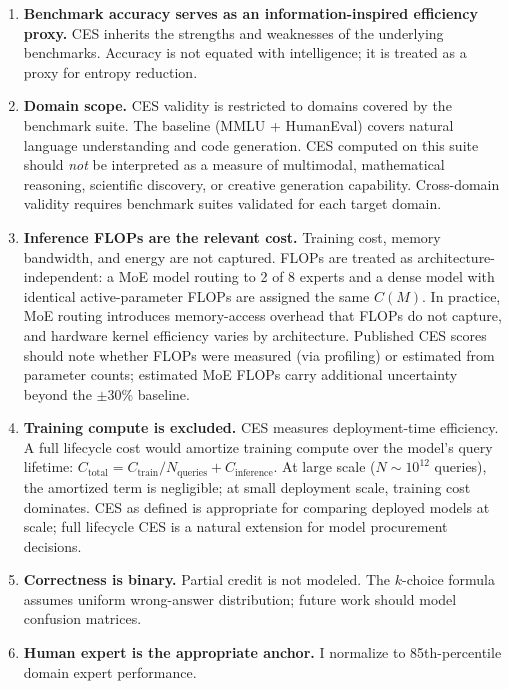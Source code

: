 \documentclass[12pt]{article}
\begin{document}
\begin{enumerate}
    \item \textbf{Benchmark accuracy serves as an information-inspired efficiency proxy.} CES inherits the strengths and weaknesses of the underlying benchmarks. Accuracy is not equated with intelligence; it is treated as a proxy for entropy reduction.
    \item \textbf{Domain scope.} CES validity is restricted to domains covered by the benchmark suite. The baseline (MMLU + HumanEval) covers natural language understanding and code generation. CES computed on this suite should \emph{not} be interpreted as a measure of multimodal, mathematical reasoning, scientific discovery, or creative generation capability. Cross-domain validity requires benchmark suites validated for each target domain.
    \item \textbf{Inference FLOPs are the relevant cost.} Training cost, memory bandwidth, and energy are not captured. FLOPs are treated as architecture-independent: a MoE model routing to 2 of 8 experts and a dense model with identical active-parameter FLOPs are assigned the same $C(M)$. In practice, MoE routing introduces memory-access overhead that FLOPs do not capture, and hardware kernel efficiency varies by architecture. Published CES scores should note whether FLOPs were measured (via profiling) or estimated from parameter counts; estimated MoE FLOPs carry additional uncertainty beyond the $\pm30\%$ baseline.
    \item \textbf{Training compute is excluded.} CES measures deployment-time efficiency. A full lifecycle cost would amortize training compute over the model's query lifetime: $C_{\text{total}} = C_{\text{train}} / N_{\text{queries}} + C_{\text{inference}}$. At large scale ($N \sim 10^{12}$ queries), the amortized term is negligible; at small deployment scale, training cost dominates. CES as defined is appropriate for comparing deployed models at scale; full lifecycle CES is a natural extension for model procurement decisions.
    \item \textbf{Correctness is binary.} Partial credit is not modeled. The $k$-choice formula assumes uniform wrong-answer distribution; future work should model confusion matrices.
    \item \textbf{Human expert is the appropriate anchor.} I normalize to 85th-percentile domain expert performance.

\end{enumerate}
\end{document}
